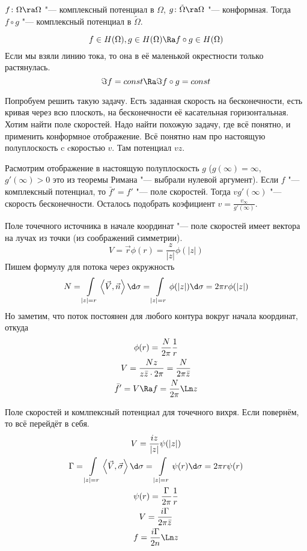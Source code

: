 \begin{assertion}
	$f\colon \Omega \ra \Omega$ "--- комплексный потенциал в $\Omega$, $g\colon \tilde\Omega \ra \Omega$ "--- конформная.
	Тогда $f \circ g$ "--- комплексный потенциал в $\tilde \Omega$.
\end{assertion}
\[ f \in H(\Omega), g \in H(\Omega) \Ra f \circ g \in H(\Omega) \]
Если мы взяли линию тока, то она в её маленькой окрестности только растянулась.
\[ \Im f = const \Ra \Im f \circ g = const \]

Попробуем решить такую задачу.
Есть заданная скорость на бесконечности, есть кривая через всю плоскоть, на бесконечности её касательная горизонтальная.
Хотим найти поле скоростей.
Надо найти похожую задачу, где всё понятно, и применить конформное отображение.
Всё понятно нам про настоящую полуплоскость c cкоростью $v$.
Там потенциал $vz$.

Расмотрим отображение в настоящую полуплоскость $g$ ($g(\infty) = \infty$, $g'(\infty) > 0$ \TODO это из теоремы Римана "--- выбрали нулевой аргумент).
Если $f$ "--- комплексный потенциал, то $\bar f' = f'$ "--- поле скоростей.
Тогда $vg'(\infty)$ "--- скорость бесконечности.
Осталось подобрать коэфициент $v = \frac{v_{\infty}}{g'(\infty)}$.

Поле точечного источника в начале координат "--- поле скоростей имеет вектора на лучах из точки (из соображений симметрии).
\[ V = \vec r \phi(r) = \frac{z}{|z|} \phi(|z|) \]
Пишем формулу для потока через окружность
\[ N = \int\limits_{|z| = r} \left< \vec V, \vec n \right> \d \sigma = \int\limits_{|z| = r} \phi(|z|) \d \sigma = 2\pi r \phi(|z|) \]
Но заметим, что поток постоянен для любого контура вокруг начала координат, откуда
\begin{gather*}
	\phi(r) = \frac N{2\pi}\frac1r \\
	V = \frac{Nz}{z\bar z \cdot 2\pi} = \frac N{2\pi \bar z} \\
	\bar f' = V \Ra f = \frac N{2\pi} \Ln z
\end{gather*}

Поле скоростей и комлпексный потенциал для точечного вихря.
Если повернём, то всё перейдёт в себя.
\begin{gather*}
	V = \frac{iz}{|z|} \psi(|z|) \\
	\Gamma
	= \int\limits_{|z|=r} \left<\vec V, \vec \sigma \right> \d \sigma
	= \int\limits_{|z|=r} \psi(r) \d \sigma
	= 2 \pi r \psi(r) \\
	\psi(r) = \frac{\Gamma}{2\pi}\frac1r \\
	V = \frac{i\Gamma}{2\pi \bar z} \\
	f = \frac{i\Gamma}{2n} \Ln z
\end{gather*}


